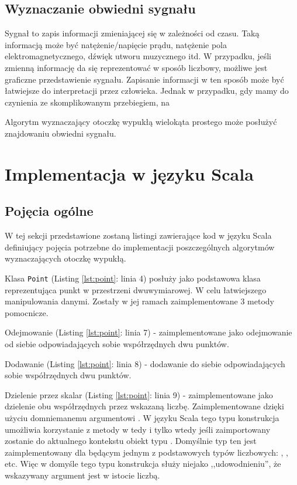         \section{Wyznaczanie obwiedni sygnału}
        Sygnał to zapis informacji zmieniającej się w zależności od czasu. Taką informacją może być natężenie/napięcie prądu, natężenie pola elektromagnetycznego, dźwięk utworu muzycznego itd. W przypadku, jeśli zmienną informację da się  reprezentować w sposób liczbowy, możliwe jest graficzne przedstawienie sygnału. Zapisanie informacji w ten sposób może być łatwiejsze do interpretacji przez człowieka. Jednak w przypadku, gdy mamy do czynienia ze skomplikowanym przebiegiem, na
        
        Algorytm wyznaczający otoczkę wypukłą wielokąta prostego może posłużyć znajdowaniu obwiedni sygnału.
        
   \chapter{Implementacja w języku Scala}\label{chap:practice}
   		\section{Pojęcia ogólne}
   		W tej sekcji przedstawione zostaną listingi zawierające kod w języku Scala definiujący pojęcia potrzebne do implementacji poszczególnych algorytmów wyznaczających otoczkę wypukłą.
   		
   		Klasa \texttt{Point} (Listing \ref{lst:point}: linia 4) posłuży jako podstawowa klasa reprezentująca punkt w przestrzeni dwuwymiarowej. W celu łatwiejszego manipulowania danymi. Zostały w jej ramach zaimplementowane 3 metody pomocnicze.
   		
   		Odejmowanie (Listing \ref{lst:point}: linia 7) - zaimplementowane jako odejmowanie od siebie odpowiadających sobie współrzędnych dwu punktów.
   		
   		Dodawanie (Listing \ref{lst:point}: linia 8) - dodawanie do siebie odpowiadających sobie współrzędnych dwu punktów.
   		
   		Dzielenie przez skalar (Listing \ref{lst:point}: linia 9) - zaimplementowane jako dzielenie obu współrzędnych przez wskazaną liczbę. Zaimplementowane dzięki użyciu domniemanemu argumentowi . W języku Scala tego typu konstrukcja umożliwia korzystanie z metody \scala{/} w tedy i tylko wtedy jeśli zaimportowany zostanie do aktualnego kontekstu obiekt typu . Domyślnie typ ten jest zaimplementowany dla  będącym jednym z podstawowych typów liczbowych: , ,  etc. Więc w domyśle tego typu konstrukcja służy niejako ,,udowodnieniu'', że wskazywany argument jest w istocie liczbą.
   		

